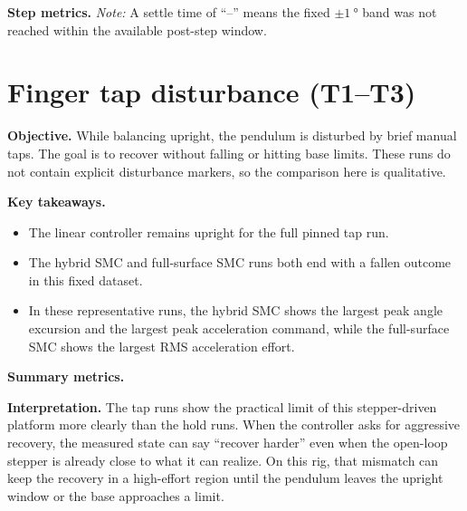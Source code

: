 \noindent\textbf{Step metrics.}
\noindent\emph{Note:} A settle time of ``--'' means the fixed $\pm\SI{1}{\degree}$ band was not reached within the available post-step window.

\clearpage

\section{Finger tap disturbance (T1--T3)}
\noindent\textbf{Objective.} While balancing upright, the pendulum is disturbed by brief manual taps. The goal is to recover without falling or hitting base limits. These runs do not contain explicit disturbance markers, so the comparison here is qualitative.

\noindent\textbf{Key takeaways.}
\begin{itemize}
  \item The linear controller remains upright for the full pinned tap run.
  \item The hybrid SMC and full-surface SMC runs both end with a fallen outcome in this fixed dataset.
  \item In these representative runs, the hybrid SMC shows the largest peak angle excursion and the largest peak acceleration command, while the full-surface SMC shows the largest RMS acceleration effort.
\end{itemize}

\noindent\textbf{Summary metrics.}


\noindent\textbf{Interpretation.} The tap runs show the practical limit of this stepper-driven platform more clearly than the hold runs. When the controller asks for aggressive recovery, the measured state can say ``recover harder'' even when the open-loop stepper is already close to what it can realize. On this rig, that mismatch can keep the recovery in a high-effort region until the pendulum leaves the upright window or the base approaches a limit.

